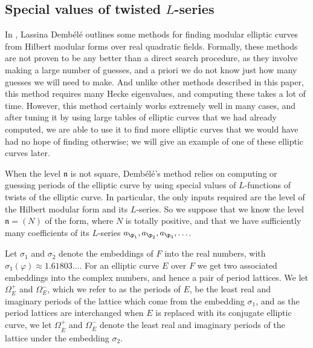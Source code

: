\documentclass{amsart}
\newcommand{\n}{\mathfrak{n}}
\newcommand{\ap}[1]{a_{\p_{#1}}}
\newcommand{\Ebar}{\overline{E}}
\newcommand{\dembele}{Demb\'el{\'e}\xspace}
\begin{document}
\subsection{Special values of twisted $L$-series}\label{sec:specialvalues}
\newcommand{\Omegap}{\Omega^+}
\newcommand{\Omegam}{\Omega^-}
\newcommand{\Omegapp}{\Omega^{++}}
\newcommand{\Omegapm}{\Omega^{+-}}
\newcommand{\Omegamp}{\Omega^{-+}}
\newcommand{\Omegamm}{\Omega^{--}}
\newcommand{\OmegammEguess}{\Omega^{--}_{E, \mathrm{guess}}}
\newcommand{\OmegampEguess}{\Omega^{-+}_{E, \mathrm{guess}}}
\newcommand{\OmegapmEguess}{\Omega^{+-}_{E, \mathrm{guess}}}
\newcommand{\OmegappEguess}{\Omega^{++}_{E, \mathrm{guess}}}

In \cite{dembele:elliptic-curves-quadratic-fields}, Lassina \dembele
outlines some methods for finding modular elliptic curves from Hilbert
modular forms over real quadratic fields. Formally, these methods are
not proven to be any better than a direct search procedure, as they
involve making a large number of guesses, and a priori we do not know
just how many guesses we will need to make. And unlike other methods
described in this paper, this method requires many Hecke eigenvalues,
and computing these takes a lot of time. However, this method
certainly works extremely well in many cases, and after tuning it by
using large tables of elliptic curves that we had already computed, we are able
to use it to find more elliptic curves that we would have had no hope of
finding otherwise; we will give an example of one of these elliptic curves
later. 

When the level $\n$ is not square, \dembele's method relies on computing
or guessing periods of the elliptic curve by using special values of
$L$-functions of twists of the elliptic curve. In particular, the only inputs
required are the level of the Hilbert modular form and its $L$-series. So
we suppose that we know the level $\n = (N)$ of the form, where $N$ is
totally positive, and that we have sufficiently many coefficients of its
$L$-series $\ap{1}, \ap{2}, \ap{3}, \ldots$.

Let $\sigma_1$ and $\sigma_2$ denote the embeddings of $F$ into the
real numbers, with $\sigma_1(\varphi) \approx 1.61803\ldots$. For
an elliptic curve $E$ over $F$ we get two associated embeddings into
the complex numbers, and hence a pair of period lattices. We let $\Omegap_E$
and $\Omegam_E$, which we refer to as the periods of $E$,
be the least real and imaginary periods of the lattice
which come from the embedding $\sigma_1$, and as the period lattices are interchanged
when $E$ is replaced with its conjugate elliptic curve, we let $\Omegap_{\Ebar}$
and $\Omegam_{\Ebar}$ denote the least real and imaginary periods
of the lattice under the embedding $\sigma_2$.
\end{document}
